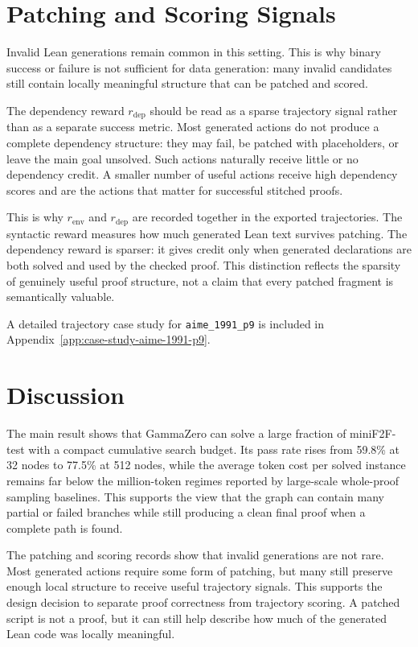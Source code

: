 \section{Patching and Scoring Signals}

Invalid Lean generations remain common in this setting. This is why binary success or failure is not
sufficient for data generation: many invalid candidates still contain locally meaningful structure that
can be patched and scored.

The dependency reward \(r_{\mathrm{dep}}\) should be read as a sparse trajectory signal rather than as a
separate success metric. Most generated actions do not produce a complete dependency structure: they
may fail, be patched with placeholders, or leave the main goal unsolved. Such actions naturally receive
little or no dependency credit. A smaller number of useful actions receive high dependency scores and
are the actions that matter for successful stitched proofs.

This is why \(r_{\mathrm{env}}\) and \(r_{\mathrm{dep}}\) are recorded together in the exported trajectories.
The syntactic reward measures
how much generated Lean text survives patching. The dependency reward is sparser: it gives credit only
when generated declarations are both solved and used by the checked proof. This distinction reflects the
sparsity of genuinely useful proof structure, not a claim that every patched
fragment is semantically valuable.

A detailed trajectory case study for \texttt{aime\_1991\_p9} is included in Appendix~\ref{app:case-study-aime-1991-p9}.

\section{Discussion}

The main result shows that GammaZero can solve a large fraction of miniF2F-test with a compact
cumulative search budget. Its pass rate rises from 59.8\% at 32 nodes to 77.5\% at 512 nodes, while
the average token cost per solved instance remains far below the million-token regimes reported by
large-scale whole-proof sampling baselines. This supports the view that the graph can contain many
partial or failed branches while still producing a clean final proof when a complete path is found.

The patching and scoring records show that invalid generations are not rare. Most generated actions require some form of patching, but many still preserve enough local structure to receive useful trajectory signals. This supports the design decision to separate proof correctness from trajectory scoring. A patched script is not a proof, but it can still help describe how much of the generated Lean code was locally meaningful.

